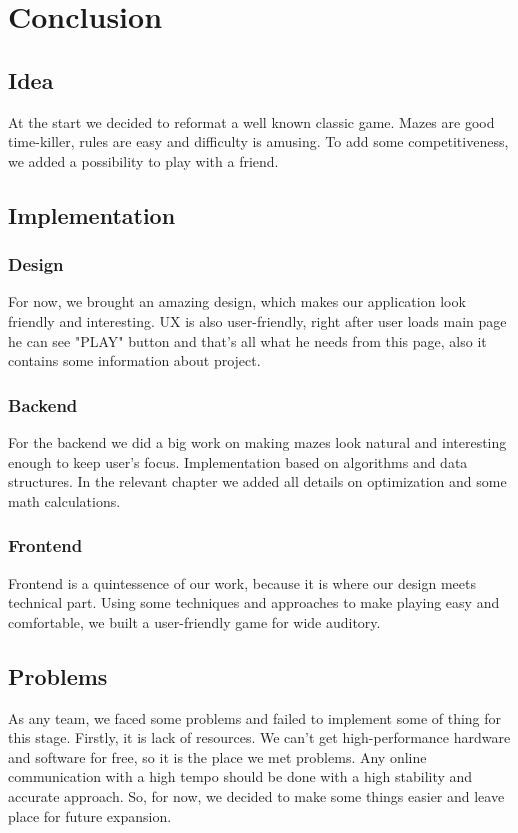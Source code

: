 \chapter{Conclusion}\label{ch:concl}
	\section{Idea}
	At the start we decided to reformat a well known classic game. Mazes are good time-killer, rules are easy and difficulty is amusing. To add some competitiveness, we added a possibility to play with a friend.
	\section{Implementation}
	\subsection{Design}
	For now, we brought an amazing design, which makes our application look friendly and interesting. UX is also user-friendly, right after user loads main page he can see "PLAY" button and that's all what he needs from this page, also it contains some information about project. 
	\subsection{Backend}
	For the backend we did a big work on making mazes look natural and interesting enough to keep user's focus. Implementation based on algorithms and data structures. In the relevant chapter we added all details on optimization and some math calculations.
	\subsection{Frontend}
	Frontend is a quintessence of our work, because it is where our design meets technical part. Using some techniques and approaches to make playing easy and comfortable, we built a user-friendly game for wide auditory.
	
	\section{Problems}
	As any team, we faced some problems and failed to implement some of thing for this stage. Firstly, it is lack of resources. We can't get high-performance hardware and software for free, so it is the place we met problems. Any online communication with a high tempo should be done with a high stability and accurate approach. So, for now, we decided to make some things easier and leave place for future expansion.